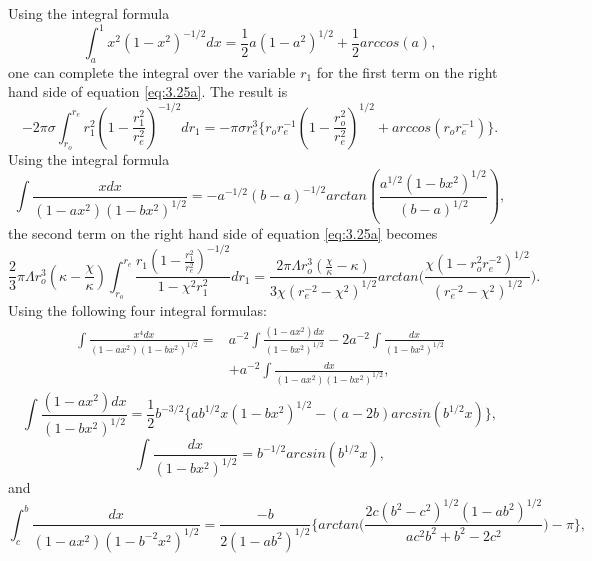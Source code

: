 \documentclass[12pt]{article}
\begin{document}
Using the integral formula
\begin{equation}
\label{eq:A1}%
\int_{a}^{1}x^{2}(1-x^{2})^{-1/2}dx=\frac{1}{2}a(1-a^{2})^{1/2}+\frac{1}{2}arccos(a),
\end{equation}
one can complete the integral over the variable $r_{1}$ for the first term on the right hand side of equation \eqref{eq:3.25a}. The result is
\begin{equation}
\label{eq:A2}%
-2\pi\sigma\int_{r_{o}}^{r_{e}}r_{1}^{2}(1-\frac{r_{1}^{2}}{r_{e}^{2}})^{-1/2}dr_{1}=-\pi\sigma r_{e}^{3}\big\{r_{o}r_{e}^{-1}(1-\frac{r_{o}^{2}}{r_{e}^{2}})^{1/2}+arccos(r_{o}r_{e}^{-1})\big\}.
\end{equation}
Using the integral formula
\begin{equation}
\label{eq:A3}%
\int \frac{xdx}{(1-ax^{2})(1-bx^{2})^{1/2}}=-a^{-1/2}(b-a)^{-1/2}arctan(\frac{a^{1/2}(1-bx^{2})^{1/2}}{(b-a)^{1/2}}),
\end{equation}
the second term on the right hand side of equation \eqref{eq:3.25a} becomes
\begin{equation}
\label{eq:A4}%
\frac{2}{3}\pi\Lambda r_{o}^{3}(\kappa-\frac{\chi}{\kappa})\int_{r_{o}}^{r_{e}}\frac{r_{1}(1-\frac{r_{1}^{2}}{r_{e}^{2}})^{-1/2}}{1-\chi^{2}r_{1}^{2}}dr_{1}=\frac{2\pi\Lambda r_{o}^{3}(\frac{\chi}{\kappa}-\kappa)}{3\chi(r_{e}^{-2}-\chi^{2})^{1/2}}
arctan\big(\frac{\chi(1-r_{o}^{2}r_{e}^{-2})^{1/2}}{(r_{e}^{-2}-\chi^{2})^{1/2}}\big).
\end{equation}
Using the following four integral formulas:
\begin{eqnarray}\begin{split}
\label{eq:A5}%
\int \frac{x^{4}dx}{(1-ax^{2})(1-bx^{2})^{1/2}}=&a^{-2}\int \frac{(1-ax^{2})dx}{(1-bx^{2})^{1/2}}-2a^{-2}\int \frac{dx}{(1-bx^{2})^{1/2}}\\&+a^{-2}\int \frac{dx}{(1-ax^{2})(1-bx^{2})^{1/2}},
\end{split}
\end{eqnarray}
\begin{equation}
\label{eq:A6}%
\int \frac{(1-ax^{2})dx}{(1-bx^{2})^{1/2}}=\frac{1}{2}b^{-3/2}\big\{ab^{1/2}x(1-bx^{2})^{1/2}-(a-2b)arcsin(b^{1/2}x)\big\},
\end{equation}
\begin{equation}
\label{eq:A7}%
\int \frac{dx}{(1-bx^{2})^{1/2}}=b^{-1/2}arcsin(b^{1/2}x),
\end{equation}
and
\begin{equation}
\label{eq:A8}%
\int_{c}^{b} \frac{dx}{(1-ax^{2})(1-b^{-2}x^{2})^{1/2}}=\frac{-b}{2(1-ab^{2})^{1/2}}\big\{arctan\big(\frac{2c(b^{2}-c^{2})^{1/2}(1-ab^{2})^{1/2}}{ac^{2}b^{2}+b^{2}-2c^{2}}\big)-\pi\big\},
\end{equation}
\end{document}
